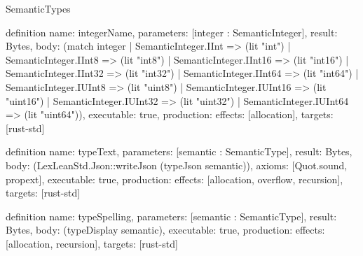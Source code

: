\begin{lexlean}{SemanticTypes}
\begin{semanticmodule}
definition{
  name: integerName,
  parameters: [integer : SemanticInteger],
  result: Bytes,
  body: (match integer
    | SemanticInteger.IInt => (lit "int")
    | SemanticInteger.IInt8 => (lit "int8")
    | SemanticInteger.IInt16 => (lit "int16")
    | SemanticInteger.IInt32 => (lit "int32")
    | SemanticInteger.IInt64 => (lit "int64")
    | SemanticInteger.IUInt8 => (lit "uint8")
    | SemanticInteger.IUInt16 => (lit "uint16")
    | SemanticInteger.IUInt32 => (lit "uint32")
    | SemanticInteger.IUInt64 => (lit "uint64")),
  executable: true,
  production: {effects: [allocation], targets: [rust-std]}
}

definition{
  name: typeText,
  parameters: [semantic : SemanticType],
  result: Bytes,
  body: (LexLeanStd.Json::writeJson (typeJson semantic)),
  axioms: [Quot.sound, propext],
  executable: true,
  production: {effects: [allocation, overflow, recursion], targets: [rust-std]}
}

definition{
  name: typeSpelling,
  parameters: [semantic : SemanticType],
  result: Bytes,
  body: (typeDisplay semantic),
  executable: true,
  production: {effects: [allocation, recursion], targets: [rust-std]}
}
\end{semanticmodule}
\end{lexlean}
